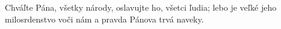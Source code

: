 Chváľte Pána, všetky národy,
oslavujte ho, všetci ľudia;
\versseparator
lebo je veľké jeho milosrdenstvo voči nám
a pravda Pánova trvá naveky.